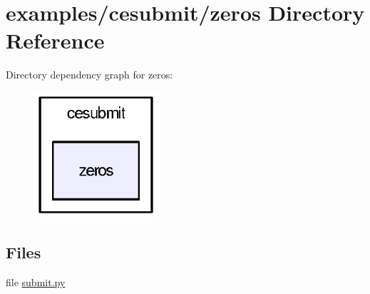 \section{examples/cesubmit/zeros Directory Reference}
\label{dir_26d746cfbec85a1dd7e060e6a1a1b724}
Directory dependency graph for zeros\-:
\nopagebreak
\begin{figure}[H]
\begin{center}
\leavevmode
\includegraphics[width=130pt]{dir_26d746cfbec85a1dd7e060e6a1a1b724_dep}
\end{center}
\end{figure}
\subsection*{Files}
\begin{DoxyCompactItemize}
\item 
file \hyperlink{submit_8py}{submit.\-py}
\end{DoxyCompactItemize}

